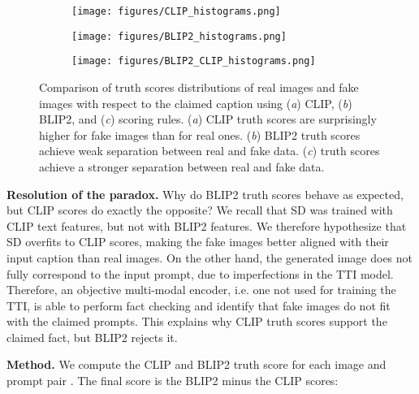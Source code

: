 \documentclass{article} \usepackage{iclr2024_conference,times}
\begin{document}
\begin{figure}
     \centering
     \begin{subfigure}[b]{0.325\textwidth}
         \centering
         \texttt{[image: figures/CLIP\_histograms.png]}
         \vspace{-1.5em}
         \caption{}
     \end{subfigure}
     \hfill
     \begin{subfigure}[b]{0.325\textwidth}
         \centering
         \texttt{[image: figures/BLIP2\_histograms.png]}
         \vspace{-1.5em}
         \caption{}
     \end{subfigure}
     \hfill
     \begin{subfigure}[b]{0.325\textwidth}
         \centering
         \texttt{[image: figures/BLIP2\_CLIP\_histograms.png]}
         \vspace{-1.5em}
         \caption{}
     \end{subfigure}
\caption{Comparison of truth scores distributions of real images and fake images with respect to the claimed caption using (\textit{a}) CLIP, (\textit{b}) BLIP2, and (\textit{c})  scoring rules. (\textit{a}) CLIP truth scores are surprisingly higher for fake images than for real ones. (\textit{b}) BLIP2 truth scores achieve weak separation between real and fake data. (\textit{c})  truth scores achieve a stronger separation between real and fake data.}
        \label{fig:Real_vs_Fakes_Histograms}
        \vspace{-0.5em}
\end{figure}


\textbf{Resolution of the paradox.} Why do BLIP2 truth scores behave as expected, but CLIP scores do exactly the opposite? We recall that SD was trained with CLIP text features, but not with BLIP2 features. We therefore hypothesize that SD overfits to CLIP scores, making the fake images better aligned with their input caption than real images. On the other hand, the generated image does not fully correspond to the input prompt, due to imperfections in the TTI model. Therefore, an objective multi-modal encoder, i.e. one not used for training the TTI, is able to perform fact checking and identify that fake images do not fit with the claimed prompts. This explains why CLIP truth scores support the claimed fact, but BLIP2 rejects it.

\textbf{Method.} We compute the CLIP and BLIP2 truth score for each image and prompt pair . The final score is the BLIP2 minus the CLIP scores:
\end{document}
